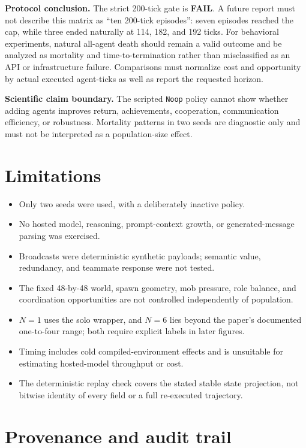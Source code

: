 \documentclass[11pt]{article}
\newcommand{\fail}{\textcolor{failred}{\textbf{FAIL}}}
\newcommand{\code}[1]{\texttt{#1}}
\begin{document}
\textbf{Protocol conclusion.}  The strict 200-tick gate is \fail{}.  A future
report must not describe this matrix as ``ten 200-tick episodes'': seven
episodes reached the cap, while three ended naturally at 114, 182, and 192
ticks.  For behavioral experiments, natural all-agent death should remain a
valid outcome and be analyzed as mortality and time-to-termination rather than
misclassified as an API or infrastructure failure.  Comparisons must normalize
cost and opportunity by actual executed agent-ticks as well as report the
requested horizon.

\textbf{Scientific claim boundary.}  The scripted \code{Noop} policy cannot
show whether adding agents improves return, achievements, cooperation,
communication efficiency, or robustness.  Mortality patterns in two seeds are
diagnostic only and must not be interpreted as a population-size effect.

\section{Limitations}

\begin{itemize}
  \item Only two seeds were used, with a deliberately inactive policy.
  \item No hosted model, reasoning, prompt-context growth, or generated-message
        parsing was exercised.
  \item Broadcasts were deterministic synthetic payloads; semantic value,
        redundancy, and teammate response were not tested.
  \item The fixed 48-by-48 world, spawn geometry, mob pressure, role balance,
        and coordination opportunities are not controlled independently of
        population.
  \item $N=1$ uses the solo wrapper, and $N=6$ lies beyond the paper's
        documented one-to-four range; both require explicit labels in later
        figures.
  \item Timing includes cold compiled-environment effects and is unsuitable for
        estimating hosted-model throughput or cost.
  \item The deterministic replay check covers the stated stable state
        projection, not bitwise identity of every field or a full re-executed
        trajectory.
\end{itemize}

\section{Provenance and audit trail}
\end{document}
